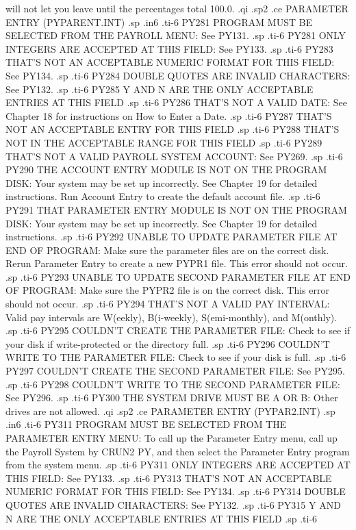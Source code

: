 will not let you leave until the percentages total 100.0.
.qi
.sp2
.ce
PARAMETER ENTRY (PYPARENT.INT)
.sp
.in6
.ti-6
PY281 PROGRAM MUST BE SELECTED FROM THE PAYROLL MENU: See PY131.
.sp
.ti-6
PY281 ONLY INTEGERS ARE ACCEPTED AT THIS FIELD: See PY133.
.sp
.ti-6
PY283 THAT'S NOT AN ACCEPTABLE NUMERIC FORMAT FOR THIS FIELD: See PY134.
.sp
.ti-6
PY284 DOUBLE QUOTES ARE INVALID CHARACTERS: See PY132.
.sp
.ti-6
PY285 Y  AND  N  ARE THE ONLY ACCEPTABLE ENTRIES AT THIS FIELD
.sp
.ti-6
PY286 THAT'S NOT A VALID DATE: See Chapter 18 for instructions on How
to Enter a Date.
.sp
.ti-6
PY287 THAT'S NOT AN ACCEPTABLE ENTRY FOR THIS FIELD
.sp
.ti-6
PY288 THAT'S NOT IN THE ACCEPTABLE RANGE FOR THIS FIELD
.sp
.ti-6
PY289 THAT'S NOT A VALID PAYROLL SYSTEM ACCOUNT: See PY269.
.sp
.ti-6
PY290  THE ACCOUNT ENTRY MODULE IS NOT ON THE PROGRAM DISK:  Your system
may be set up incorrectly. See Chapter 19 for detailed instructions.
Run Account Entry to create the default account file.
.sp
.ti-6
PY291 THAT PARAMETER ENTRY MODULE IS NOT ON THE PROGRAM DISK:  Your system
may be set up incorrectly.  See Chapter 19 for detailed instructions.
.sp
.ti-6
PY292 UNABLE TO UPDATE PARAMETER FILE AT END OF PROGRAM: Make sure the
parameter files are on the correct disk.  Rerun Parameter Entry to create
a new PYPR1 file. This error should not occur.
.sp
.ti-6
PY293 UNABLE TO UPDATE SECOND PARAMETER FILE AT END OF PROGRAM:  Make sure
the PYPR2 file is on the correct disk.	This error should not occur.
.sp
.ti-6
PY294 THAT'S NOT A VALID PAY INTERVAL: Valid pay intervals are W(eekly),
B(i-weekly), S(emi-monthly), and M(onthly).
.sp
.ti-6
PY295 COULDN'T CREATE THE PARAMETER FILE:  Check to see if your disk
if write-protected or the directory full.
.sp
.ti-6
PY296 COULDN'T WRITE TO THE PARAMETER FILE: Check to see if your disk is
full.
.sp
.ti-6
PY297 COULDN'T CREATE THE SECOND PARAMETER FILE: See PY295.
.sp
.ti-6
PY298 COULDN'T WRITE TO THE SECOND PARAMETER FILE: See PY296.
.sp
.ti-6
PY300 THE SYSTEM DRIVE MUST BE	A  OR  B: Other drives are not allowed.
.qi
.sp2
.ce
PARAMETER ENTRY (PYPAR2.INT)
.sp
.in6
.ti-6
PY311 PROGRAM MUST BE SELECTED FROM THE PARAMETER ENTRY MENU: To call
up the Parameter Entry menu, call up the Payroll System by CRUN2 PY,
and then select the Parameter Entry program from the system menu.
.sp
.ti-6
PY311 ONLY INTEGERS ARE ACCEPTED AT THIS FIELD: See PY133.
.sp
.ti-6
PY313 THAT'S NOT AN ACCEPTABLE NUMERIC FORMAT FOR THIS FIELD: See PY134.
.sp
.ti-6
PY314 DOUBLE QUOTES ARE INVALID CHARACTERS: See PY132.
.sp
.ti-6
PY315 Y  AND  N  ARE THE ONLY ACCEPTABLE ENTRIES AT THIS FIELD
.sp
.ti-6
